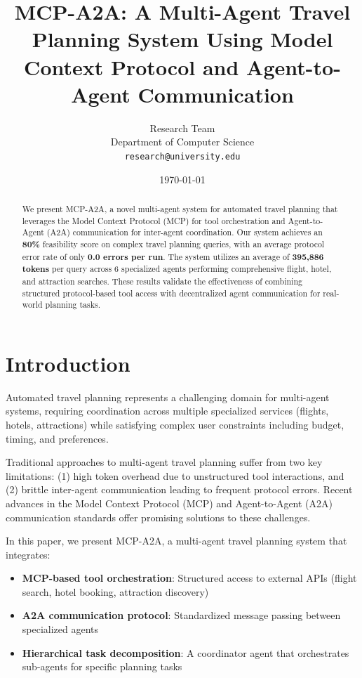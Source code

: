 \documentclass[11pt,a4paper]{article}
\title{MCP-A2A: A Multi-Agent Travel Planning System Using Model Context Protocol and Agent-to-Agent Communication}
\author{Research Team\\
Department of Computer Science\\
\texttt{research@university.edu}}
\date{\today}
\begin{document}
\maketitle

\begin{abstract}
We present MCP-A2A, a novel multi-agent system for automated travel planning that leverages the Model Context Protocol (MCP) for tool orchestration and Agent-to-Agent (A2A) communication for inter-agent coordination. Our system achieves an \textbf{80\%} feasibility score on complex travel planning queries, with an average protocol error rate of only \textbf{0.0 errors per run}. The system utilizes an average of \textbf{395,886 tokens} per query across 6 specialized agents performing comprehensive flight, hotel, and attraction searches. These results validate the effectiveness of combining structured protocol-based tool access with decentralized agent communication for real-world planning tasks.
\end{abstract}

\section{Introduction}

Automated travel planning represents a challenging domain for multi-agent systems, requiring coordination across multiple specialized services (flights, hotels, attractions) while satisfying complex user constraints including budget, timing, and preferences.

Traditional approaches to multi-agent travel planning suffer from two key limitations: (1) high token overhead due to unstructured tool interactions, and (2) brittle inter-agent communication leading to frequent protocol errors. Recent advances in the Model Context Protocol (MCP) and Agent-to-Agent (A2A) communication standards offer promising solutions to these challenges.

In this paper, we present MCP-A2A, a multi-agent travel planning system that integrates:
\begin{itemize}
    \item \textbf{MCP-based tool orchestration}: Structured access to external APIs (flight search, hotel booking, attraction discovery)
    \item \textbf{A2A communication protocol}: Standardized message passing between specialized agents
    \item \textbf{Hierarchical task decomposition}: A coordinator agent that orchestrates sub-agents for specific planning tasks
\end{itemize}
\end{document}
